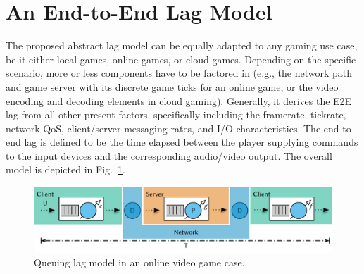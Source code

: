 \section{An End-to-End Lag Model}
\label{sec:model}

The proposed abstract lag model can be equally adapted to any gaming use case, be it either local games, online games, or cloud games. Depending on the specific scenario, more or less components have to be factored in (e.g., the network path and game server with its discrete game ticks for an online game, or the video encoding and decoding elements in cloud gaming). Generally, it derives the \gls{E2E} lag from all other present factors, specifically including the framerate, tickrate, network \gls{QoS}, client/server messaging rates, and I/O characteristics. The end-to-end lag is defined to be the time elapsed between the player supplying commands to the input devices and the corresponding audio/video output. The overall model is depicted in Fig.~\ref{fig:queuing-model}.

\begin{figure}[!t]
	\centering
	\includegraphics[width=1.0\columnwidth]{../../models/e2e-lag-model.pdf}
	\caption{Queuing lag model in an online video game case.}
\label{fig:queuing-model}
\end{figure}

